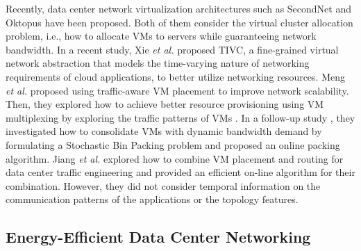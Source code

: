 \documentclass[journal,single-space,two column,twoside,10pt]{IEEEtran}
\begin{document}
Recently, data center network virtualization architectures such as SecondNet \cite{Guo_Lu-2010} and Oktopus \cite{Ballani_Costa-2011} have been proposed. Both of them consider the virtual cluster allocation problem, i.e., how to allocate VMs to servers while guaranteeing network bandwidth. In a recent study, Xie \emph{et al.} \cite{Xie_Ding-2012} proposed TIVC, a fine-grained virtual network abstraction that models the time-varying nature of networking requirements of cloud applications, to better utilize networking resources. Meng \emph{et al.} \cite{Meng_Pappas-2010} proposed using traffic-aware VM placement to improve network scalability. Then, they explored how to achieve better resource provisioning using VM multiplexing by exploring the traffic patterns of VMs \cite{Meng_Isci-2010}. In a follow-up study \cite{Wang_Meng-2011}, they investigated how to consolidate VMs with dynamic bandwidth demand by formulating a Stochastic Bin Packing problem and proposed an online packing algorithm. Jiang \emph{et al.} \cite{Jiang_Lan-2012} explored how to combine VM placement and routing for data center traffic engineering and provided an efficient on-line algorithm for their combination. However, they did not consider temporal information on the communication patterns of the applications or the topology features.


\subsection{Energy-Efficient Data Center Networking}
\end{document}
